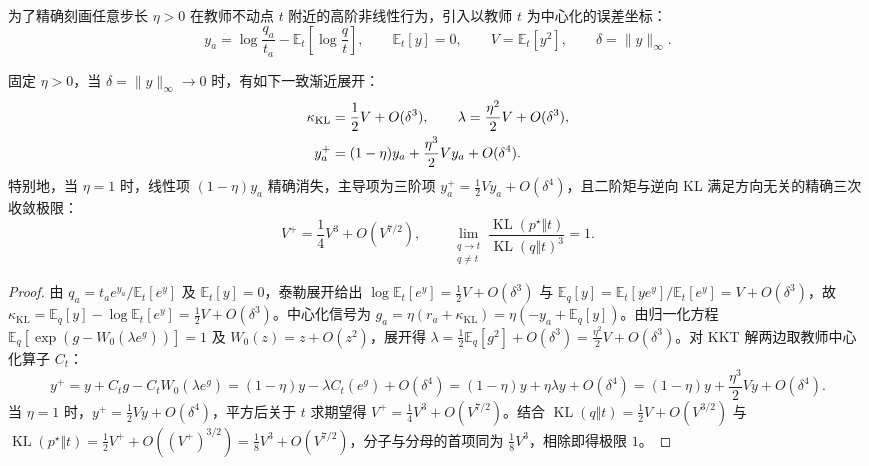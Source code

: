 \documentclass[lang=cn,scheme=chinese,openany]{elegantbook}
\newcommand{\E}{\mathbb E}
\newcommand{\KL}{\operatorname{KL}}
\begin{document}
为了精确刻画任意步长 $\eta>0$ 在教师不动点 $t$ 附近的高阶非线性行为，引入以教师 $t$ 为中心化的误差坐标：
\begin{equation}
 y_a=\log\frac{q_a}{t_a}-\E_t\left[\log\frac{q}{t}\right],
 \qquad \E_t[y]=0,\qquad V=\E_t[y^2],\qquad \delta=\|y\|_\infty.
 \label{dyn:eq:mean-hard-sync-centered-coordinate}
\end{equation}

\begin{theorem}[PMD-Mean 更新的三阶局部展开与 $\eta=1$ 的精确三次 KL 极限]
\label{dyn:thm:mean-hard-sync-local-expansion}
固定 $\eta>0$，当 $\delta=\|y\|_\infty\to 0$ 时，有如下一致渐近展开：
\begin{align}
 \kappa_{\mathrm{KL}}&=\frac12 V+O(\delta^3),\qquad
 \lambda=\frac{\eta^2}{2}V+O(\delta^3),\notag\\
 y_a^+&=(1-\eta)y_a+\frac{\eta^3}{2}V y_a+O(\delta^4).
 \label{dyn:eq:mean-hard-sync-local-expansion}
\end{align}
特别地，当 $\eta=1$ 时，线性项 $(1-\eta)y_a$ 精确消失，主导项为三阶项 $y_a^+=\frac12 V y_a+O(\delta^4)$，且二阶矩与逆向 KL 满足方向无关的精确三次收敛极限：
\begin{equation}
 V^+=\frac14 V^3+O(V^{7/2}),
 \qquad
 \lim_{\substack{q\to t\\ q\ne t}}\frac{\KL(p^\star\Vert t)}{\KL(q\Vert t)^3}=1.
 \label{dyn:eq:mean-hard-sync-kl-cubic}
\end{equation}
\end{theorem}
\begin{proof}
由 $q_a=t_a e^{y_a}/\E_t[e^y]$ 及 $\E_t[y]=0$，泰勒展开给出 $\log\E_t[e^y]=\frac12 V+O(\delta^3)$ 与 $\E_q[y]=\E_t[y e^y]/\E_t[e^y]=V+O(\delta^3)$，故 $\kappa_{\mathrm{KL}}=\E_q[y]-\log\E_t[e^y]=\frac12 V+O(\delta^3)$。中心化信号为 $g_a=\eta(r_a+\kappa_{\mathrm{KL}})=\eta(-y_a+\E_q[y])$。由归一化方程 $\E_q[\exp(g-W_0(\lambda e^g))]=1$ 及 $W_0(z)=z+O(z^2)$，展开得 $\lambda=\frac12\E_q[g^2]+O(\delta^3)=\frac{\eta^2}{2}V+O(\delta^3)$。对 KKT 解两边取教师中心化算子 $C_t$：
\begin{equation*}
 y^+=y+C_t g-C_t W_0(\lambda e^g)
 =(1-\eta)y-\lambda C_t(e^g)+O(\delta^4)
 =(1-\eta)y+\eta\lambda y+O(\delta^4)
 =(1-\eta)y+\frac{\eta^3}{2}V y+O(\delta^4).
\end{equation*}
当 $\eta=1$ 时，$y^+=\frac12 V y+O(\delta^4)$，平方后关于 $t$ 求期望得 $V^+=\frac14 V^3+O(V^{7/2})$。结合 $\KL(q\Vert t)=\frac12 V+O(V^{3/2})$ 与 $\KL(p^\star\Vert t)=\frac12 V^++O((V^+)^{3/2})=\frac18 V^3+O(V^{7/2})$，分子与分母的首项同为 $\frac18 V^3$，相除即得极限 $1$。
\end{proof}
\end{document}
